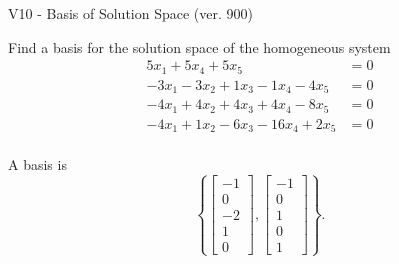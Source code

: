 \begin{exercise}
  \begin{exerciseTitle}V10 - Basis of Solution Space (ver. 900)\end{exerciseTitle}
  \begin{exerciseStatement}
    Find a basis for the solution space of the homogeneous system 
\begin{align*}
 5 x_ 1 + 5 x_ 4 + 5 x_ 5 &= 0  \\ 
  -3 x_ 1 -3 x_ 2 + 1 x_ 3 -1 x_ 4 -4 x_ 5 &= 0  \\ 
  -4 x_ 1 + 4 x_ 2 + 4 x_ 3 + 4 x_ 4 -8 x_ 5 &= 0  \\ 
  -4 x_ 1 + 1 x_ 2 -6 x_ 3 -16 x_ 4 + 2 x_ 5 &= 0  \\ 
 \end{align*}


 
  \end{exerciseStatement}

  \begin{exerciseAnswer}
   A basis is   
\[\left\{\left[\begin{array}{c}
-1 \\
0 \\
-2 \\
1 \\
0
\end{array}\right] , \left[\begin{array}{c}
-1 \\
0 \\
1 \\
0 \\
1
\end{array}\right]\right\}.\]

  


  \end{exerciseAnswer}
\end{exercise}